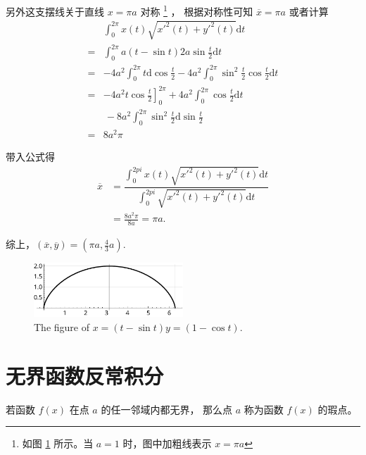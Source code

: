 \begin{example}
    另外这支摆线关于直线 $x = \pi a$ 对称
    \footnote{如图 \ref{fig:figure-of-w660-question-208} 所示。当 $a = 1$ 时，图中加粗线表示 $x = \pi a$} ，
    根据对称性可知 $\overline x = \pi a$
    或者计算 
    \begin{align*}
         &\int_0^{2\pi} x(t) \sqrt{x'^2(t) + y'^2(t)} \mathrm dt \\
        =&\int_0^{2\pi} a(t - \sin t) 2a \sin \frac{t}{2} \mathrm dt \\
        =&-4a^2 \int_0^{2\pi} t \mathrm d \cos \frac{t}{2} - 4a^2 \int_{0}^{2\pi} \sin^2 \frac{t}{2} \cos \frac{t}{2} \mathrm dt \\
        =&-4a^2 t \left.\cos \frac{t}{2}\right]^{2\pi}_0 + 4a^2 \int_0^{2\pi} \cos \frac{t}{2} \mathrm dt \\
         &{\,} -8a^2 \int_0^{2\pi} \sin^2 \frac{t}{2} \mathrm d \sin \frac{t}{2} \\
        =&8a^2 \pi
    \end{align*}

    带入公式得
    \begin{align*}
        \overline x &= \dfrac{
                           \int_0^{2pi} x(t) \sqrt{x'^2(t) + y'^2(t)} \mathrm dt 
                       }{
                           \int_0^{2pi} \sqrt{x'^2(t) + y'^2(t)} \mathrm dt
                       } \\
                    &= \frac{8a^2 \pi}{8a} = \pi a.
    \end{align*}
    
    综上，$(\overline x, \overline y) = (\pi a, \frac{4}{3}a)$.
\end{example}

\begin{figure}
    \centering
    \includegraphics[width=0.5\textwidth]{figure/figure-of-w660-question-208.pdf}
    \caption{The figure of $x = (t - \sin t) y = (1 - \cos t)$.}
    \label{fig:figure-of-w660-question-208}
\end{figure}

\section{无界函数反常积分}

\begin{definition}
    若函数 $f(x)$ 在点 $a$ 的任一邻域内都无界，
    那么点 $a$ 称为函数 $f(x)$ 的瑕点。
\end{definition}

